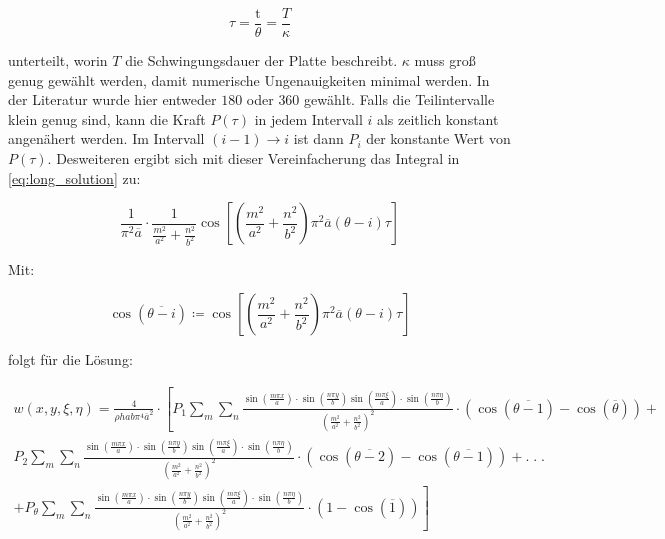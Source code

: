  \begin{equation}
 	\tau = \dfrac{\mbox{t}}{\theta}=\dfrac{T}{\kappa}
 \end{equation}
 
 unterteilt, worin $T$ die Schwingungsdauer der Platte beschreibt. $\kappa$ muss groß genug gewählt werden, damit numerische Ungenauigkeiten minimal werden. In der Literatur wurde hier entweder $180$ oder $360$ gewählt. Falls die Teilintervalle klein genug sind, kann die Kraft $P(\tau	)$ in jedem Intervall $i$ als zeitlich konstant angenähert werden. Im Intervall $(i-1) \rightarrow i$ ist dann $P_{i}$ der konstante Wert von $P(\tau)$. Desweiteren ergibt sich mit dieser Vereinfacherung das Integral in \ref{eq:long_solution} zu:
 
 \begin{equation}
 	\frac{1}{\pi^2\overline{a}} \cdot \frac{1}{\frac{m^2}{a^2}+\frac{n^2}{b^2}} \cos \left[ \left( \frac{m^2}{a^2}+\frac{n^2}{b^2} \right) \pi^2\overline{a}(\theta - i)\tau\right]
 \end{equation}  
 
Mit:

$$\cos\left(\overline{\theta - i}\right) \coloneqq \cos \left[ \left( \frac{m^2}{a^2}+\frac{n^2}{b^2} \right) \pi^2\overline{a}(\theta - i)\tau\right] $$

folgt für die Lösung:

\begin{equation}
\begin{multlined}
	w(x,y,\xi, \eta) = \frac{4}{\rho h a b \pi^4 \overline{a}^2} \cdot \left[ P_{1} \sum_m \sum_n \frac{\sin\left(\frac{m \pi x}{a}\right) \cdot \sin\left(\frac{n \pi y}{b}\right) \sin\left(\frac{m \pi \xi}{a}\right) \cdot \sin\left(\frac{n \pi \eta}{b}\right)	}{ \left( \frac{m^2}{a^2} + \frac{n^2}{b^2} \right)^2} \cdot \left( \cos(\overline{\theta-1}) - \cos(\overline{\theta}) \right) + \right. \\ P_{2} \sum_m \sum_n \frac{\sin\left(\frac{m \pi x}{a}\right) \cdot \sin\left(\frac{n \pi y}{b}\right) \sin\left(\frac{m \pi \xi}{a}\right) \cdot \sin\left(\frac{n \pi \eta}{b}\right)	}{ \left( \frac{m^2}{a^2} + \frac{n^2}{b^2} \right)^2} \cdot \left( \cos(\overline{\theta-2}) - \cos(\overline{\theta-1}) \right) + . \; . \; .\ \\ \left. + P_{\theta} \sum_m \sum_n \frac{\sin\left(\frac{m \pi x}{a}\right) \cdot \sin\left(\frac{n \pi y}{b}\right) \sin\left(\frac{m \pi \xi}{a}\right) \cdot \sin\left(\frac{n \pi \eta}{b}\right)	}{ \left( \frac{m^2}{a^2} + \frac{n^2}{b^2} \right)^2} \cdot \left( 1 - \cos(\overline{1}) \right) \right]
	\label{eq:horror}
\end{multlined}
\end{equation}

